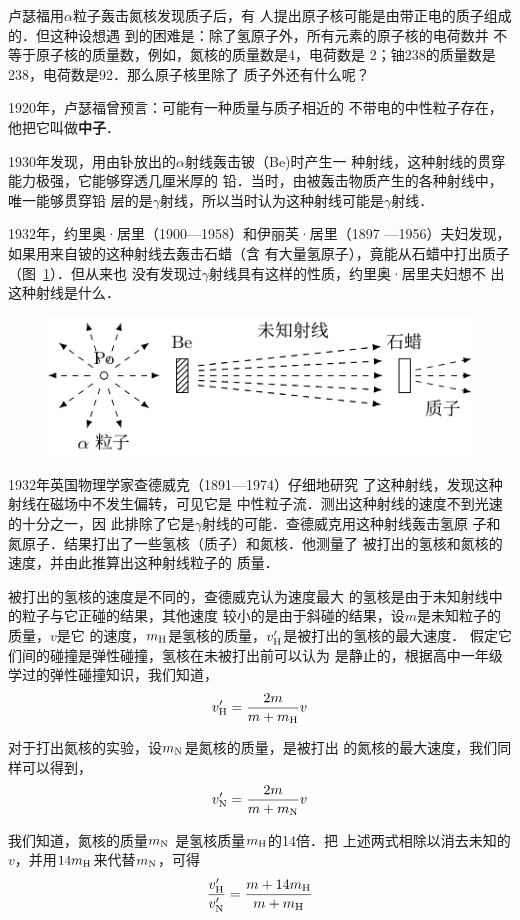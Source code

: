 卢瑟福用$\alpha$粒子轰击氮核发现质子后，有
人提出原子核可能是由带正电的质子组成的．但这种设想遇
到的困难是：除了氢原子外，所有元素的原子核的电荷数并
不等于原子核的质量数，例如，氮核的质量数是4，电荷数是
2；铀238的质量数是238，电荷数是92．那么原子核里除了
质子外还有什么呢？

1920年，卢瑟福曾预言：可能有一种质量与质子相近的
不带电的中性粒子存在，他把它叫做\textbf{中子}．

1930年发现，用由钋放出的$\alpha$射线轰击铍（Be)时产生一
种射线，这种射线的贯穿能力极强，它能够穿透几厘米厚的
铅．当时，由被轰击物质产生的各种射线中，唯一能够贯穿铅
层的是$\gamma$射线，所以当时认为这种射线可能是$\gamma$射线．

1932年，约里奥·居里（1900—1958）和伊丽芙·居里（1897
—1956）夫妇发现，如果用来自铍的这种射线去轰击石蜡（含
有大量氢原子），竟能从石蜡中打出质子（图~\ref{fig_C_9-8}）．但从来也
没有发现过$\gamma$射线具有这样的性质，约里奥·居里夫妇想不
出这种射线是什么．
\begin{figure}[htbp]
    \centering
    \includegraphics{fig/C/9-8.pdf}
    \caption{}\label{fig_C_9-8}
\end{figure}

1932年英国物理学家查德威克（1891—1974）仔细地研究
了这种射线，发现这种射线在磁场中不发生偏转，可见它是
中性粒子流．测出这种射线的速度不到光速的十分之一，因
此排除了它是$\gamma$射线的可能．查德威克用这种射线轰击氢原
子和氮原子．结果打出了一些氢核（质子）和氮核．他测量了
被打出的氢核和氮核的速度，并由此推算出这种射线粒子的
质量．

被打出的氢核的速度是不同的，查德威克认为速度最大
的氢核是由于未知射线中的粒子与它正碰的结果，其他速度
较小的是由于斜碰的结果，设$m$是未知粒子的质量，$v$是它
的速度，$m_{\rm H}$是氢核的质量，$v'_{\rm H}$是被打出的氢核的最大速度．
假定它们间的碰撞是弹性碰撞，氢核在未被打出前可以认为
是静止的，根据高中一年级学过的弹性碰撞知识，我们知道，
\[ v'_{\rm H}=\frac{2m}{m+m_{\rm H}}v \]

对于打出氮核的实验，设$m_{\rm N}$是氮核的质量，是被打出
的氮核的最大速度，我们同样可以得到，
\[ v'_{\rm N}=\frac{2m}{m+m_{\rm N}}v\]

我们知道，氮核的质量$m_{\rm N}$
是氢核质量$m_{\rm H}$的14倍．把
上述两式相除以消去未知的$v$，并用$14m_{\rm H}$来代替$m_{\rm N}$，可得
\[ \frac{v'_{\rm H}}{v'_{\rm N}} =\frac{m+14m_{\rm H}}{m+m_{\rm H}}\]

